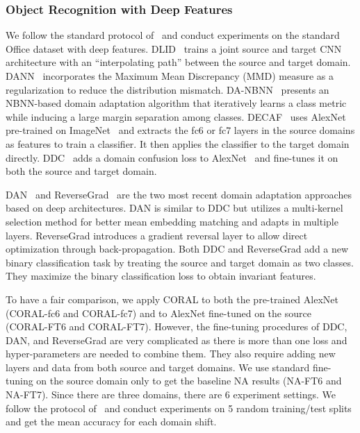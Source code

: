 \documentclass[letterpaper]{article}
\begin{document}
\subsubsection{Object Recognition with Deep Features}  
We follow the standard protocol of~\cite{decaf,tzeng_arxiv15,dan_long15,reversegrad} and conduct experiments on the standard Office dataset with deep features. DLID~\cite{chopra2013dlid} trains a joint source and target CNN architecture with an ``interpolating path'' between the source and target domain. DANN~\cite{DANN} incorporates the Maximum Mean Discrepancy (MMD) measure as a regularization to reduce the distribution mismatch. DA-NBNN~\cite{da_nbnn} presents an NBNN-based domain adaptation algorithm that  iteratively learns a class metric while inducing a large margin separation among classes. DECAF~\cite{decaf} uses  AlexNet~\cite{alexnet} pre-trained on ImageNet~\cite{imagenet} and extracts the fc6 or fc7 layers in the source domains as features to train a classifier. It then applies the classifier to the target domain directly. DDC~\cite{tzeng_arxiv15} adds a domain confusion loss to AlexNet~\cite{alexnet} and fine-tunes it on both the source and target domain.  

DAN~\cite{dan_long15} and ReverseGrad~\cite{reversegrad} are the two most recent domain adaptation approaches based on deep architectures. DAN is similar to DDC but utilizes a multi-kernel selection method for better mean embedding matching and adapts in multiple layers. ReverseGrad introduces a gradient reversal layer to allow direct optimization through back-propagation. Both DDC and ReverseGrad add a new binary classification task by treating the source and target domain as two classes. They maximize the binary classification loss to obtain invariant features. 

To have a fair comparison, we apply CORAL to both the pre-trained AlexNet (CORAL-fc6 and CORAL-fc7) and to AlexNet fine-tuned on the source (CORAL-FT6 and CORAL-FT7). However, the fine-tuning procedures of DDC, DAN, and ReverseGrad are very complicated as there is more than one loss and hyper-parameters are needed to combine them. They also require adding new layers and data from both source and target domains. We use standard fine-tuning on the source domain only to get the baseline NA results (NA-FT6 and NA-FT7). Since there are three domains, there are 6 experiment settings. We follow the protocol of~\cite{decaf,tzeng_arxiv15,reversegrad} and conduct experiments on 5 random training/test splits and get the mean accuracy for each domain shift. 
\end{document}
